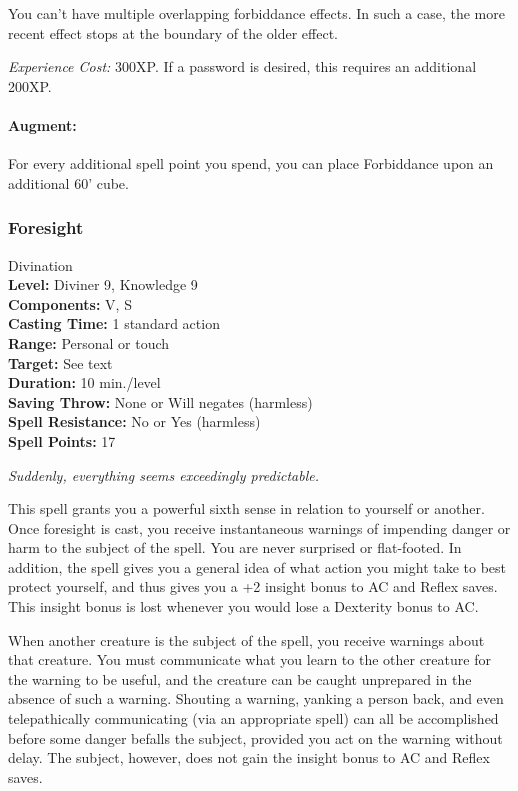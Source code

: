 You can't have multiple overlapping forbiddance effects. 
In such a case, the more recent effect stops at the boundary of the older effect.

\emph{Experience Cost:} 300XP. If a password is desired, this requires an additional 200XP.

\paragraph{Augment:} For every additional spell point you spend, you can place Forbiddance upon an additional 60' cube.


\subsubsection{Foresight}
\label{Spell:Foresight}
Divination
\\ \textbf{Level:} Diviner 9, Knowledge 9
\\ \textbf{Components:} V, S
\\ \textbf{Casting Time:} 1 standard action
\\ \textbf{Range:} Personal or touch
\\ \textbf{Target:} See text
\\ \textbf{Duration:} 10 min./level
\\ \textbf{Saving Throw:} None or Will negates (harmless)
\\ \textbf{Spell Resistance:} No or Yes (harmless)
\\ \textbf{Spell Points:} 17

\emph{Suddenly, everything seems exceedingly predictable.}

This spell grants you a powerful sixth sense in relation to yourself or another. 
Once foresight is cast, you receive instantaneous warnings of impending danger or harm to the subject of the spell. 
You are never surprised or flat-footed. 
In addition, the spell gives you a general idea of what action you might take to best protect yourself,
and thus gives you a +2 insight bonus to AC and Reflex saves. 
This insight bonus is lost whenever you would lose a Dexterity bonus to AC.

When another creature is the subject of the spell, you receive warnings about that creature. 
You must communicate what you learn to the other creature for the warning to be useful, 
and the creature can be caught unprepared in the absence of such a warning. 
Shouting a warning, yanking a person back, and even telepathically communicating (via an appropriate spell) 
can all be accomplished before some danger befalls the subject, provided you act on the warning without delay. 
The subject, however, does not gain the insight bonus to AC and Reflex saves.


